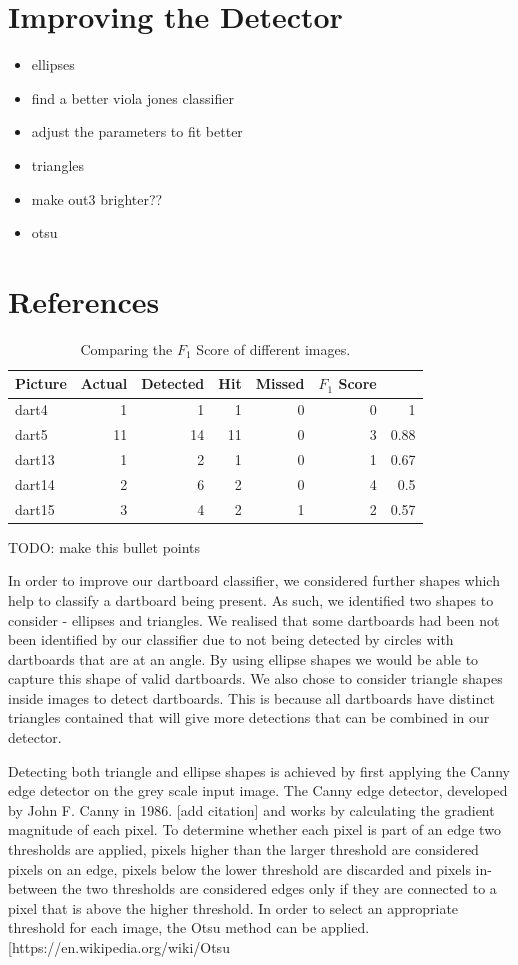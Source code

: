 \documentclass[a4paper]{article}
\begin{document}
\section{Improving the Detector}
\begin{itemize}
	\item ellipses
	\item find a better viola jones classifier
	\item adjust the parameters to fit better
	\item triangles
    \item make out3 brighter??
    \item otsu
\end{itemize}

\section{References}


\begin{table} [H]
\centering
\begin{tabular}{l| r | r | r | r | r | r}
Picture & Actual & Detected & Hit & Missed & \(F_{1}\) Score \\\hline
dart4 & 1 & 1 & 1 & 0 & 0 & 1\\
dart5 & 11 & 14 & 11 & 0 & 3 & 0.88 \\
dart13 & 1 & 2 & 1 & 0 & 1 & 0.67 \\
dart14 & 2 & 6 & 2 & 0 & 4 & 0.5 \\
dart15 & 3 & 4 & 2 & 1 & 2 & 0.57
\end{tabular}
\caption{\label{tab:F1}Comparing the \(F_{1}\) Score of different images.}
\end{table}

TODO: make this bullet points

In order to improve our dartboard classifier, we considered further shapes
which help to classify a dartboard being present.  As such, we identified two
shapes to consider - ellipses and triangles.  We realised that some dartboards
had been not been identified by our classifier due to not being detected by
circles with dartboards that are at an angle.  By using ellipse shapes we would
be able to capture this shape of valid dartboards.  We also chose to consider
triangle shapes inside images to detect dartboards.  This is because all
dartboards have distinct triangles contained that will give more detections
that can be combined in our detector.

Detecting both triangle and ellipse shapes is achieved by first applying the
Canny edge detector on the grey scale input image.  The Canny edge detector,
developed by  John F. Canny in 1986. [add citation] and works by calculating
the gradient magnitude of each pixel. To determine whether each pixel is part
of an edge two thresholds are applied, pixels higher than the larger threshold
are considered pixels on an edge, pixels below the lower threshold are
discarded and pixels in-between the two thresholds are considered edges only if
they are connected to a pixel that is above the higher threshold.  In order to
select an appropriate threshold for each image, the Otsu method can be applied.
[https://en.wikipedia.org/wiki/Otsu%
\end{document}

